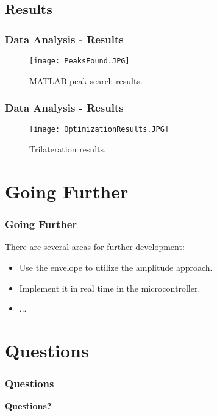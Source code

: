 \subsection{Results}
\begin{frame}

	\frametitle{Data Analysis - Results}
	
	\begin{figure}[h!]
		\centering
		\texttt{[image: PeaksFound.JPG]}
		\caption{MATLAB peak search results.}
	\end{figure}
	
\end{frame}


\begin{frame}

	\frametitle{Data Analysis - Results}
	
	\begin{figure}[h!]
		\centering
		\texttt{[image: OptimizationResults.JPG]}
		\caption{Trilateration results.}
	\end{figure}
	
\end{frame}


%
%

\section{Going Further}
\begin{frame}

	\frametitle{Going Further}
	
	There are several areas for further development:

	\begin{itemize}
		\item<1-> Use the envelope to utilize the amplitude approach.
		\item<2-> Implement it in real time in the microcontroller.
		\item<3-> ...
	\end{itemize}

\end{frame}


%
%

\section{Questions}
\begin{frame}

	\frametitle{Questions}
	
	\begin{center}
	\begin{LARGE}
		\textbf{Questions?}
	\end{LARGE}
	\end{center}

\end{frame}





